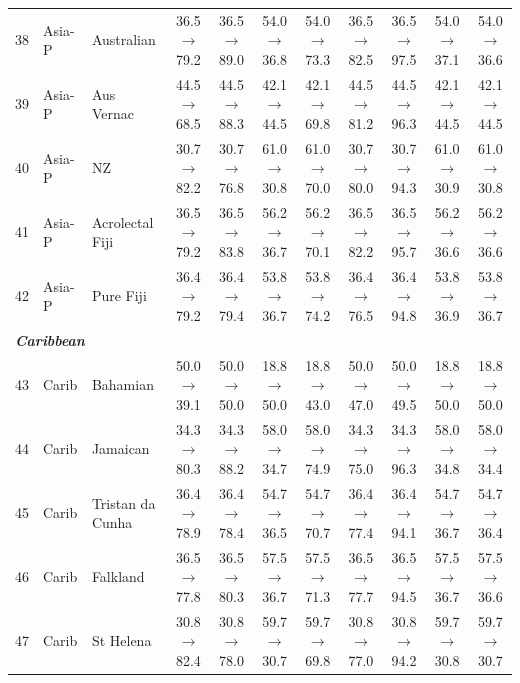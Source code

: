\begin{table}[t]
{\begin{tabular}{rll c c c c c c c c}
38 & Asia-P & Australian & 36.5$\rightarrow$79.2 & 36.5$\rightarrow$89.0 & 54.0$\rightarrow$36.8 & 54.0$\rightarrow$73.3 & 36.5$\rightarrow$82.5 & 36.5$\rightarrow$97.5 & 54.0$\rightarrow$37.1 & 54.0$\rightarrow$36.6 \\
39 & Asia-P & Aus Vernac & 44.5$\rightarrow$68.5 & 44.5$\rightarrow$88.3 & 42.1$\rightarrow$44.5 & 42.1$\rightarrow$69.8 & 44.5$\rightarrow$81.2 & 44.5$\rightarrow$96.3 & 42.1$\rightarrow$44.5 & 42.1$\rightarrow$44.5 \\
40 & Asia-P & NZ & 30.7$\rightarrow$82.2 & 30.7$\rightarrow$76.8 & 61.0$\rightarrow$30.8 & 61.0$\rightarrow$70.0 & 30.7$\rightarrow$80.0 & 30.7$\rightarrow$94.3 & 61.0$\rightarrow$30.9 & 61.0$\rightarrow$30.8 \\
41 & Asia-P & Acrolectal Fiji & 36.5$\rightarrow$79.2 & 36.5$\rightarrow$83.8 & 56.2$\rightarrow$36.7 & 56.2$\rightarrow$70.1 & 36.5$\rightarrow$82.2 & 36.5$\rightarrow$95.7 & 56.2$\rightarrow$36.6 & 56.2$\rightarrow$36.6 \\
42 & Asia-P & Pure Fiji & 36.4$\rightarrow$79.2 & 36.4$\rightarrow$79.4 & 53.8$\rightarrow$36.7 & 53.8$\rightarrow$74.2 & 36.4$\rightarrow$76.5 & 36.4$\rightarrow$94.8 & 53.8$\rightarrow$36.9 & 53.8$\rightarrow$36.7 \\
\midrule
\multicolumn{11}{l}{\textit{\textbf{Caribbean}}} \\
43 & Carib & Bahamian & 50.0$\rightarrow$39.1 & 50.0$\rightarrow$50.0 & 18.8$\rightarrow$50.0 & 18.8$\rightarrow$43.0 & 50.0$\rightarrow$47.0 & 50.0$\rightarrow$49.5 & 18.8$\rightarrow$50.0 & 18.8$\rightarrow$50.0 \\
44 & Carib & Jamaican & 34.3$\rightarrow$80.3 & 34.3$\rightarrow$88.2 & 58.0$\rightarrow$34.7 & 58.0$\rightarrow$74.9 & 34.3$\rightarrow$75.0 & 34.3$\rightarrow$96.3 & 58.0$\rightarrow$34.8 & 58.0$\rightarrow$34.4 \\
45 & Carib & Tristan da Cunha & 36.4$\rightarrow$78.9 & 36.4$\rightarrow$78.4 & 54.7$\rightarrow$36.5 & 54.7$\rightarrow$70.7 & 36.4$\rightarrow$77.4 & 36.4$\rightarrow$94.1 & 54.7$\rightarrow$36.7 & 54.7$\rightarrow$36.4 \\
46 & Carib & Falkland & 36.5$\rightarrow$77.8 & 36.5$\rightarrow$80.3 & 57.5$\rightarrow$36.7 & 57.5$\rightarrow$71.3 & 36.5$\rightarrow$77.7 & 36.5$\rightarrow$94.5 & 57.5$\rightarrow$36.7 & 57.5$\rightarrow$36.6 \\
47 & Carib & St Helena & 30.8$\rightarrow$82.4 & 30.8$\rightarrow$78.0 & 59.7$\rightarrow$30.7 & 59.7$\rightarrow$69.8 & 30.8$\rightarrow$77.0 & 30.8$\rightarrow$94.2 & 59.7$\rightarrow$30.8 & 59.7$\rightarrow$30.7 \\

\end{tabular}}
\end{table}
